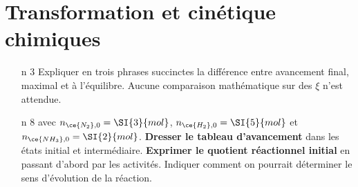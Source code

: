 \documentclass[a4paper, 10pt, final, garamond]{book}
\begin{document}
\setcounter{chapter}{7}


\chapter{Transformation et cinétique chimiques}

\begin{enumerate}[label=\sqenumi, leftmargin=10pt]
	\item[n]{3}%
	      Expliquer en trois phrases succinctes la différence entre avancement
	      final, maximal et à l'équilibre. Aucune comparaison mathématique sur des
	      $\xi$ n'est attendue.
	      \smallbreak
	\item[n]{8}%
	      \smallbreak
	      \vspace{-15pt}
	      avec $n_{\ce{N_2},0} = \SI{3}{mol}$, $n_{\ce{H_2},0} = \SI{5}{mol}$ et
	      $n_{\ce{NH_3},0} = \SI{2}{mol}$. \textbf{Dresser le tableau
		      d'avancement} dans les états initial et intermédiaire.
	      \textbf{Exprimer le quotient réactionnel initial} en passant d'abord par
	      les activités. Indiquer comment on pourrait déterminer le sens d'évolution
	      de la réaction.
	      \smallbreak
\end{enumerate}
\end{document}
